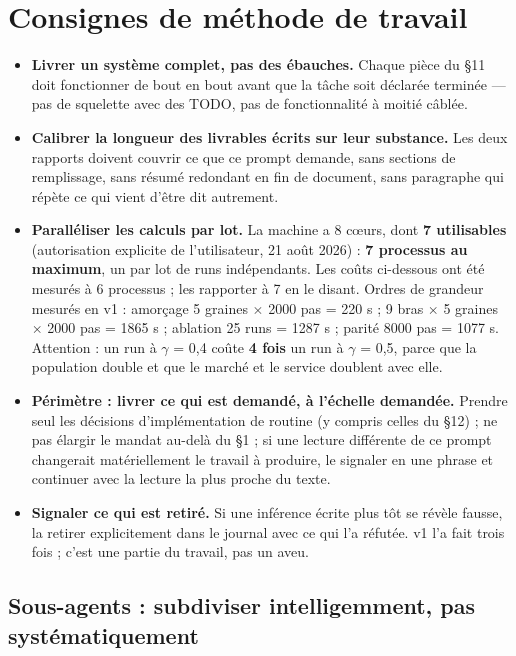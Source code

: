 \documentclass[11pt,a4paper]{article}
\begin{document}
\setcounter{section}{14}
\section{Consignes de méthode de travail}

\begin{itemize}
\item \textbf{Livrer un système complet, pas des ébauches.} Chaque pièce du §11 doit fonctionner de bout en bout avant que la tâche soit déclarée terminée --- pas de squelette avec des TODO, pas de fonctionnalité à moitié câblée.
\item \textbf{Calibrer la longueur des livrables écrits sur leur substance.} Les deux rapports doivent couvrir ce que ce prompt demande, sans sections de remplissage, sans résumé redondant en fin de document, sans paragraphe qui répète ce qui vient d'être dit autrement.
\item \textbf{Paralléliser les calculs par lot.} La machine a 8 cœurs, dont \textbf{7 utilisables} (autorisation explicite de l'utilisateur, 21 août 2026) : \textbf{7 processus au maximum}, un par lot de runs indépendants. Les coûts ci-dessous ont été mesurés à 6 processus ; les rapporter à 7 en le disant. Ordres de grandeur mesurés en v1 : amorçage 5 graines \ensuremath{\times} 2000 pas = 220 s ; 9 bras \ensuremath{\times} 5 graines \ensuremath{\times} 2000 pas = 1865 s ; ablation 25 runs = 1287 s ; parité 8000 pas = 1077 s. Attention : un run à \ensuremath{\gamma} = 0,4 coûte \textbf{4 fois} un run à \ensuremath{\gamma} = 0,5, parce que la population double et que le marché et le service doublent avec elle.
\item \textbf{Périmètre : livrer ce qui est demandé, à l'échelle demandée.} Prendre seul les décisions d'implémentation de routine (y compris celles du §12) ; ne pas élargir le mandat au-delà du §1 ; si une lecture différente de ce prompt changerait matériellement le travail à produire, le signaler en une phrase et continuer avec la lecture la plus proche du texte.
\item \textbf{Signaler ce qui est retiré.} Si une inférence écrite plus tôt se révèle fausse, la retirer explicitement dans le journal avec ce qui l'a réfutée. v1 l'a fait trois fois ; c'est une partie du travail, pas un aveu.
\end{itemize}

\subsection*{Sous-agents : subdiviser intelligemment, pas systématiquement}
\end{document}
